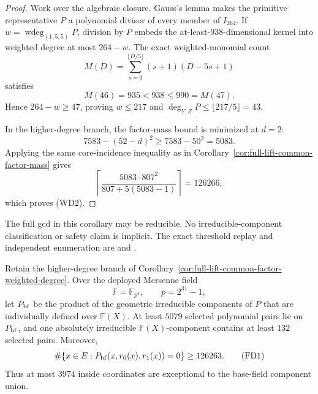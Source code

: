 \documentclass[11pt,a4paper]{amsart}
\numberwithin{equation}{section}
\theoremstyle{remark}
\newcommand{\F}{\mathbb F}\newcommand{\B}{\mathbb B}\newcommand{\K}{\mathbb K}\newcommand{\Z}{\mathbb Z}
\begin{document}
\begin{proof}
Work over the algebraic closure.  Gauss's lemma makes the primitive
representative $P$ a polynomial divisor of every member of $I_{264}$.  If
$w=\operatorname{wdeg}_{(1,5,5)}P$, division by $P$ embeds the
at-least-$938$-dimensional kernel into weighted degree at most $264-w$.
The exact weighted-monomial count
\[
 M(D)=\sum_{s=0}^{\lfloor D/5\rfloor}(s+1)(D-5s+1)
\]
satisfies
\[
 M(46)=935<938\le990=M(47).
\]
Hence $264-w\ge47$, proving $w\le217$ and
$\deg_{Y,Z}P\le\lfloor217/5\rfloor=43$.

In the higher-degree branch, the factor-mass bound is minimized at $d=2$:
\[
 7583-(52-d)^2\ge7583-50^2=5083.
\]
Applying the same core-incidence inequality as in
Corollary~\ref{cor:full-lift-common-factor-mass} gives
\[
 \left\lceil
 \frac{5083\cdot807^2}{807+5(5083-1)}
 \right\rceil=126266,
\]
which proves (WD2).
\end{proof}

\begin{remark}
The full gcd in this corollary may be reducible.  No irreducible-component
classification or safety claim is implicit.  The exact threshold replay and
independent enumeration are
and
.
\end{remark}

\begin{corollary}
\label{cor:full-lift-common-factor-base-field-descent}
Retain the higher-degree branch of
Corollary~\ref{cor:full-lift-common-factor-weighted-degree}.  Over the
deployed Mersenne field
\[
 \F=\F_{p^4},\qquad p=2^{31}-1,
\]
let $P_{\rm bf}$ be the product of the geometric irreducible components of
$P$ that are individually defined over $\F(X)$.  At least $5079$ selected
polynomial pairs lie on $P_{\rm bf}$, and one absolutely irreducible
$\F(X)$-component contains at least $132$ selected pairs.  Moreover,
\[
 \#\{x\in E:P_{\rm bf}(x,r_0(x),r_1(x))=0\}\ge126263. \tag{FD1}
\]
Thus at most $3974$ inside coordinates are exceptional to the base-field
component union.
\end{corollary}
\end{document}
